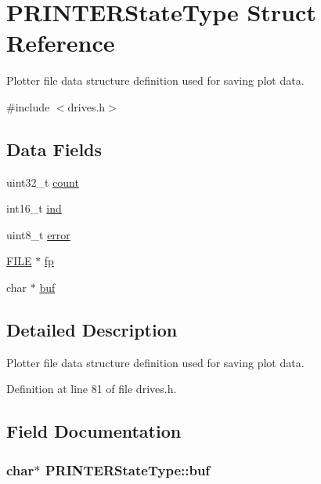 \hypertarget{structPRINTERStateType}{}\section{P\+R\+I\+N\+T\+E\+R\+State\+Type Struct Reference}
\label{structPRINTERStateType}


Plotter file data structure definition used for saving plot data.  




{\ttfamily \#include $<$drives.\+h$>$}

\subsection*{Data Fields}
\begin{DoxyCompactItemize}
\item 
uint32\+\_\+t \hyperlink{structPRINTERStateType_ae115fc351910f3801e37b31f254fb8f4}{count}
\item 
int16\+\_\+t \hyperlink{structPRINTERStateType_a7d8873d0011f31d7dd00c2b7e0d362bd}{ind}
\item 
uint8\+\_\+t \hyperlink{structPRINTERStateType_a6e5b550f5396901febd5475445132dd0}{error}
\item 
\hyperlink{posix_8h_aed4dabeb9f7c518ded42f930a04abce8}{F\+I\+LE} $\ast$ \hyperlink{structPRINTERStateType_a791c78d68d169f9d2e60d34b890e520a}{fp}
\item 
char $\ast$ \hyperlink{structPRINTERStateType_aa48220761aa3c77c954a55f09388c615}{buf}
\end{DoxyCompactItemize}


\subsection{Detailed Description}
Plotter file data structure definition used for saving plot data. 

Definition at line 81 of file drives.\+h.



\subsection{Field Documentation}
\subsubsection[{\texorpdfstring{buf}{buf}}]{\setlength{\rightskip}{0pt plus 5cm}char$\ast$ P\+R\+I\+N\+T\+E\+R\+State\+Type\+::buf}\hypertarget{structPRINTERStateType_aa48220761aa3c77c954a55f09388c615}{}\label{structPRINTERStateType_aa48220761aa3c77c954a55f09388c615}


